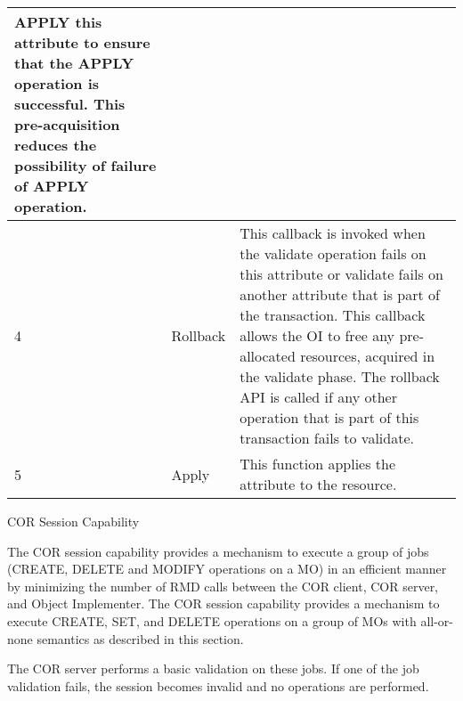 \begin{flushleft}
\begin{tabular}{|l|l|p{4in}|}
         APPLY this attribute to ensure that the APPLY operation is successful. This pre-acquisition reduces the possibility of
         failure of APPLY operation. \\
\hline
         4 & Rollback & This callback is invoked when the validate operation fails on this attribute or validate fails on another attribute that is part of 
         the transaction. This callback allows the OI to free any pre-allocated resources, acquired in the validate phase. The rollback API is called if 
         any other operation that is part of this transaction fails to validate.  \\
\hline
         5 & Apply & This function applies the attribute to the resource. \\
\hline
\end{tabular}  


\begin{Desc}
\item
[COR Session Capability]\end{Desc}
The COR session capability provides a mechanism to execute a group of jobs (CREATE, DELETE and MODIFY operations on a MO) in an efficient manner by minimizing the number of RMD calls between the COR 
client, COR server, and Object Implementer. The COR session capability provides a mechanism to execute CREATE, SET, and DELETE operations on a group of MOs with
all-or-none semantics as described in this section.
\par
The COR server performs a basic validation on these jobs. If one of the job validation fails, the session becomes invalid and no
operations are performed.


\end{flushleft}
